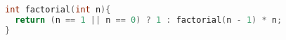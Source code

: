 \begin{lstlisting}[language=C++]
int factorial(int n){
  return (n == 1 || n == 0) ? 1 : factorial(n - 1) * n;
}
\end{lstlisting}